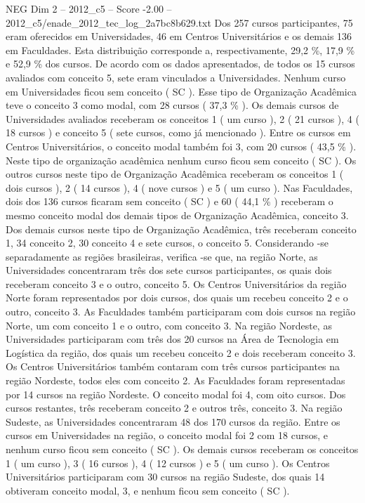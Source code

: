 \begin{textsample}{NEG Dim 2 – 2012\_c5 – Score -2.00 – 2012\_c5/enade\_2012\_tec\_log\_2a7bc8b629.txt}
Dos 257 cursos participantes, 75 eram oferecidos em Universidades, 46 em Centros Universitários e os demais 136 em Faculdades.
Esta distribuição corresponde a, respectivamente, 29,2 \%, 17,9 \% e 52,9 \% dos cursos.
De acordo com os dados apresentados, de todos os 15 cursos avaliados com conceito 5, sete eram vinculados a Universidades.
Nenhum curso em Universidades ficou sem conceito ( SC ).
Esse tipo de Organização Acadêmica teve o conceito 3 como modal, com 28 cursos ( 37,3 \% ).
Os demais cursos de Universidades avaliados receberam os conceitos 1 ( um curso ), 2 ( 21 cursos ), 4 ( 18 cursos ) e conceito 5 ( sete cursos, como já mencionado ).
Entre os cursos em Centros Universitários, o conceito modal também foi 3, com 20 cursos ( 43,5 \% ).
Neste tipo de organização acadêmica nenhum curso ficou sem conceito ( SC ).
Os outros cursos neste tipo de Organização Acadêmica receberam os conceitos 1 ( dois cursos ), 2 ( 14 cursos ), 4 ( nove cursos ) e 5 ( um curso ).
Nas Faculdades, dois dos 136 cursos ficaram sem conceito ( SC ) e 60 ( 44,1 \% ) receberam o mesmo conceito modal dos demais tipos de Organização Acadêmica, conceito 3.
Dos demais cursos neste tipo de Organização Acadêmica, três receberam conceito 1, 34 conceito 2, 30 conceito 4 e sete cursos, o conceito 5.
Considerando -se separadamente as regiões brasileiras, verifica -se que, na região Norte, as Universidades concentraram três dos sete cursos participantes, os quais dois receberam conceito 3 e o outro, conceito 5.
Os Centros Universitários da região Norte foram representados por dois cursos, dos quais um recebeu conceito 2 e o outro, conceito 3.
As Faculdades também participaram com dois cursos na região Norte, um com conceito 1 e o outro, com conceito 3.
Na região Nordeste, as Universidades participaram com três dos 20 cursos na Área de Tecnologia em Logística da região, dos quais um recebeu conceito 2 e dois receberam conceito 3.
Os Centros Universitários também contaram com três cursos participantes na região Nordeste, todos eles com conceito 2.
As Faculdades foram representadas por 14 cursos na região Nordeste.
O conceito modal foi 4, com oito cursos.
Dos cursos restantes, três receberam conceito 2 e outros três, conceito 3.
Na região Sudeste, as Universidades concentraram 48 dos 170 cursos da região.
Entre os cursos em Universidades na região, o conceito modal foi 2 com 18 cursos, e nenhum curso ficou sem conceito ( SC ).
Os demais cursos receberam os conceitos 1 ( um curso ), 3 ( 16 cursos ), 4 ( 12 cursos ) e 5 ( um curso ).
Os Centros Universitários participaram com 30 cursos na região Sudeste, dos quais 14 obtiveram conceito modal, 3, e nenhum ficou sem conceito ( SC ).

\end{textsample}
